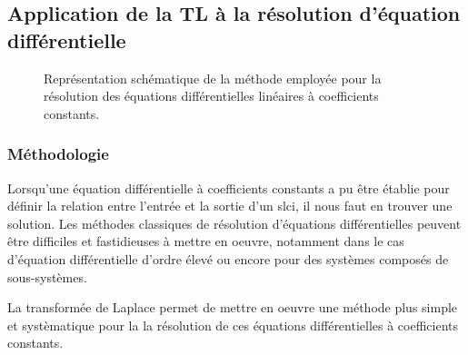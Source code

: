 \subsection[Application de la transformée de Laplace]
           {Application de la TL à la résolution d'équation différentielle}
\begin{figure}[!ht]
    \centering
    
    \caption{Représentation schématique de la méthode employée pour la 
             résolution des équations différentielles linéaires à 
             coefficients constants.\label{fig-laplace_schema}}
\end{figure}
\subsubsection{Méthodologie}
Lorsqu'une équation différentielle à coefficients constants a pu être établie
pour définir la relation entre l'entrée et la sortie d'un \gls{slci}, il 
nous faut en trouver une solution. Les méthodes classiques de résolution 
d'équations différentielles peuvent être difficiles et fastidieuses à mettre 
en oeuvre, notamment dans le cas d'équation différentielle d'ordre élevé 
ou encore pour des systèmes composés de sous-systèmes.

La transformée de Laplace permet de mettre en oeuvre une méthode plus simple et 
systèmatique  pour la la résolution de ces équations différentielles à 
coefficients constants.

